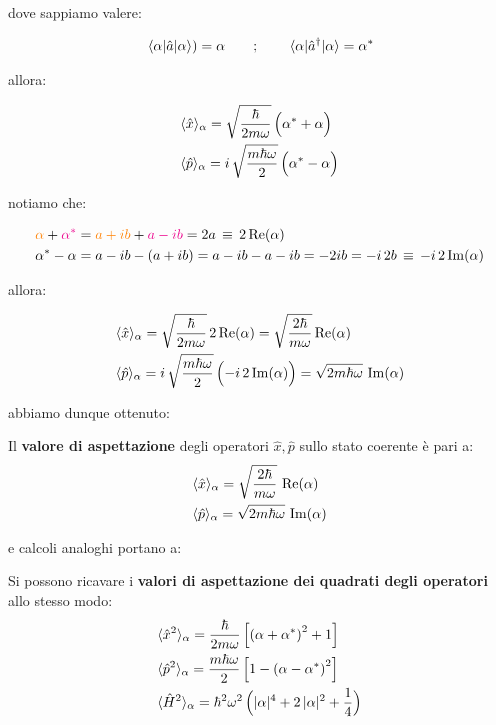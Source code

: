 	dove sappiamo valere:
	
\begin{align*}
	\mel{\alpha}{\hat{a}}{\alpha}) = \alpha \qquad ; \qquad \mel{\alpha}{\hat{a}^{\dagger}}{\alpha} = \alpha^*
\end{align*}

	allora:
	
\begin{align*}
	& \langle \hat{x} \rangle_{\alpha} = \sqrt{\frac{\hbar}{2m\omega}} \, \qty\Big( \alpha^*+  \alpha)  \\
	& \langle \hat{p} \rangle_{\alpha} = i \, \sqrt{\frac{m\hbar\omega}{2}} \, \qty\Big( \alpha^* -  \alpha)
\end{align*}

	notiamo che:
	
\begin{align*}
	& \textcolor{orange}{\alpha} +\textcolor{Magenta}{ \alpha^*} = \textcolor{orange}{a + ib} + \textcolor{Magenta}{a - ib} = 2a \, \equiv \, 2 \Re(\alpha) \\
	& \alpha^* - \alpha = a - ib - \qty(a + ib) = a - ib - a - ib = -2ib = - i \, 2 b \, \equiv \,  - i \,  2 \Im(\alpha)
\end{align*}

	allora:

\begin{align*}
	& \langle \hat{x} \rangle_{\alpha} = \sqrt{\frac{\hbar}{2m\omega}} \, 2 \Re(\alpha) =  \sqrt{\frac{2\hbar}{m\omega}} \Re(\alpha) \\
	& \langle \hat{p} \rangle_{\alpha} = i \, \sqrt{\frac{m\hbar\omega}{2}} \, \qty\Big(- i \, 2 \Im(\alpha)) =  \sqrt{2m\hbar\omega} \, \Im(\alpha)
\end{align*}

	abbiamo dunque ottenuto:

\begin{mydef}
	Il \textbf{valore di aspettazione} degli operatori $\hat{x}, \hat{p}$ sullo stato coerente è pari a:
\begin{align*}
	& \langle \hat{x} \rangle_{\alpha} =\sqrt{\frac{2\hbar}{m\omega}} \, \Re (\alpha) \\
	&  \langle \hat{p} \rangle_{\alpha} = \sqrt{2m\hbar \omega} \, \Im (\alpha)
\end{align*}
\end{mydef}

	e calcoli analoghi portano a:

\begin{mydef}
	Si possono ricavare i \textbf{valori di aspettazione dei quadrati degli operatori} allo stesso modo:
\begin{align*}
	& \langle \hat{x}^2 \rangle_{\alpha} = \frac{\hbar}{2m\omega} \, \qty\Big[\qty(\alpha + \alpha^*)^2 + 1 ] \\
	& \langle \hat{p}^2 \rangle_{\alpha} = \frac{m\hbar\omega}{2} \, \qty\Big[ 1 - \qty(\alpha - \alpha^*)^2 ] \\
	& \langle \hat{H}^2 \rangle_{\alpha}  = \hbar^2 \omega^2 \, \qty\Big( |\alpha|^4 + 2 \, |\alpha|^2 + \frac{1}{4} )
\end{align*}
\end{mydef}

